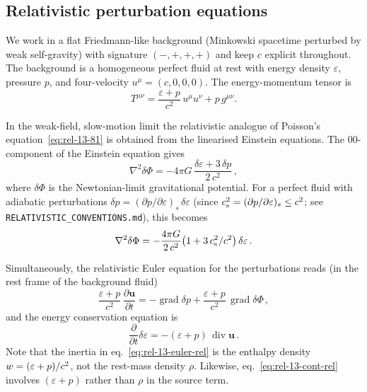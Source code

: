 \subsection{Relativistic perturbation equations}
\label{sec:rel-13-119c}

We work in a flat Friedmann-like background (Minkowski spacetime
perturbed by weak self-gravity) with signature $(-,+,+,+)$ and
keep $c$ explicit throughout.  The background is a homogeneous
perfect fluid at rest with energy density $\varepsilon$, pressure
$p$, and four-velocity $u^{\mu} = (c, 0, 0, 0)$.  The
energy-momentum tensor is
\begin{equation}
\label{eq:rel-13-Tmunu}
  T^{\mu\nu}
  = \frac{\varepsilon + p}{c^{2}}\,u^{\mu}u^{\nu}
    + p\,g^{\mu\nu}.
\end{equation}

In the weak-field, slow-motion limit the relativistic analogue of
Poisson's equation~\eqref{eq:rel-13-81} is obtained from the
linearised Einstein equations.  The $00$-component of the
Einstein equation gives
\begin{equation}
\label{eq:rel-13-poisson-rel}
  \nabla^{2}\delta\Phi
  = -4\pi G\,\frac{\delta\varepsilon + 3\,\delta p}{2\,c^{2}}\,,
\end{equation}
where $\delta\Phi$ is the Newtonian-limit gravitational potential.
For a perfect fluid with adiabatic perturbations $\delta p =
(\partial p/\partial\varepsilon)_{s}\,\delta\varepsilon$ (since $c_{\mathrm{s}}^{2} = (\partial
p/\partial\varepsilon)_{s} \leq c^{2}$; see
\texttt{RELATIVISTIC\_CONVENTIONS.md}), this becomes
\begin{equation}
\label{eq:rel-13-poisson-rel2}
  \nabla^{2}\delta\Phi
  = -\frac{4\pi G}{2\,c^{2}}
    \bigl(1 + 3\,c_{\mathrm{s}}^{2}/c^{2}\bigr)\,\delta\varepsilon\,.
\end{equation}

Simultaneously, the relativistic Euler equation for the
perturbations reads (in the rest frame of the background fluid)
\begin{equation}
\label{eq:rel-13-euler-rel}
  \frac{\varepsilon + p}{c^{2}}\,
  \frac{\partial\mathbf{u}}{\partial t}
  = -\operatorname{grad}\delta p
    + \frac{\varepsilon + p}{c^{2}}\,
      \operatorname{grad}\delta\Phi\,,
\end{equation}
and the energy conservation equation is
\begin{equation}
\label{eq:rel-13-cont-rel}
  \frac{\partial}{\partial t}\delta\varepsilon
  = -(\varepsilon + p)\,\operatorname{div}\mathbf{u}\,.
\end{equation}
Note that the inertia in eq.~\eqref{eq:rel-13-euler-rel} is the
enthalpy density $w = (\varepsilon + p)/c^{2}$, not the
rest-mass density $\rho$.  Likewise, eq.~\eqref{eq:rel-13-cont-rel}
involves $(\varepsilon + p)$ rather than $\rho$ in the source term.


